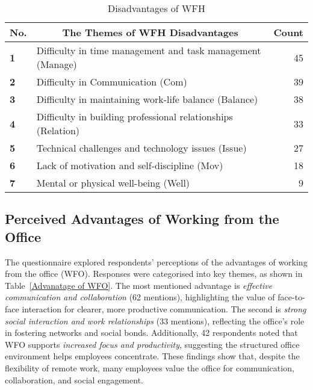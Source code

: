 \documentclass[a4paper, conference]{IEEEtran}
\begin{document}
\begin{table}[ht]
	\caption{Disadvantages of WFH}
	\label{Disadvantages of WFH}
	\begin{tabular}{|p{}|p{}|r|}
		\hline
		\multicolumn{1}{|c|}{\textbf{No.}} & \multicolumn{1}{c|}{\textbf{The Themes of WFH Disadvantages}} & \multicolumn{1}{c|}{\textbf{Count}} \\ \hline
		\textbf{1}                 & Difficulty in time management and task management (Manage) & 45 %
		\\ \hline
		\textbf{2}                 & Difficulty in Communication (Com) & 39 %
		\\ \hline
		\textbf{3}                 & Difficulty in maintaining work-life balance (Balance)    & 38 %
		\\ \hline
		\textbf{4}                 & Difficulty in building professional relationships (Relation)  & 33 %
		\\ \hline
		\textbf{5}                 & Technical challenges and technology issues (Issue)     & 27
		\\ \hline
		\textbf{6}                 & Lack of motivation and self-discipline (Mov)       & 18 %
		\\ \hline
		\textbf{7}                 & Mental or physical well-being (Well) & 9               \\ \hline
	\end{tabular}
\end{table}


\subsection{Perceived Advantages of Working from the Office}
\label{sec:advantage-wfo}

The questionnaire explored respondents' perceptions of the advantages of working from the office (WFO). Responses were categorised into key themes, as shown in Table~\ref{Advanatage of WFO}. The most mentioned advantage is \textit{effective communication and collaboration} (62 mentions), highlighting the value of face-to-face interaction for clearer, more productive communication. The second is \textit{strong social interaction and work relationships} (33 mentions), reflecting the office's role in fostering networks and social bonds. Additionally, 42 respondents noted that WFO supports \textit{increased focus and productivity}, suggesting the structured office environment helps employees concentrate. These findings show that, despite the flexibility of remote work, many employees value the office for communication, collaboration, and social engagement.
\end{document}
